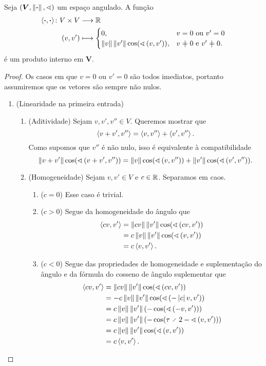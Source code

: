 \begin{proposition}
Seja $(\bm V, \left\Vert{\bm{\cdot}}\right\Vert,\sphericalangle)$ um espaço angulado. A função
	\begin{align*}
		\func{\inte{\var}{\var}}{V \times V}{\R}{(v,v')}{
			\begin{cases}
				0, &\text{$v=0$ ou $v'=0$} \\
				\nor{v}\nor{v'}\cos(\ang{v}{v'}), &\text{$v \neq 0$ e $v' \neq 0$}.
			\end{cases}
		}
	\end{align*}
é um produto interno em $\bm V$.
\end{proposition}
\begin{proof}
Os casos em que $v=0$ ou $v'=0$ são todos imediatos, portanto assumiremos que os vetores são sempre não nulos.
	\begin{enumerate}
		\item (Linearidade na primeira entrada)
			\begin{enumerate}
				\item (Aditividade) Sejam $v,v',v'' \in V$. Queremos mostrar que
					\begin{equation*}
						\left\langle{v+v'},{v''}\right\rangle = \left\langle{v},{v''}\right\rangle + \left\langle{v'},{v''}\right\rangle.
					\end{equation*}
				Como supomos que $v''$ é não nulo, isso é equivalente à compatibilidade
					\begin{equation*}
						\left\Vert{v+v'}\right\Vert\cos(\sphericalangle\left({v+v'},{v''}\right)) = \left\Vert{v}\right\Vert\cos(\sphericalangle\left({v},{v''}\right)) + \left\Vert{v'}\right\Vert\cos(\sphericalangle\left({v'},{v''}\right)).
					\end{equation*}

				\item (Homogeneidade) Sejam $v,v' \in V$ e $c \in \mathbb{R}$. Separamos em caos.
					\begin{enumerate}
						\item ($c=0$) Esse caso é trivial.
						\item ($c>0$) Segue da homogeneidade do ângulo que
							\begin{align*}
								\left\langle{cv},{v'}\right\rangle &= \left\Vert{cv}\right\Vert\left\Vert{v'}\right\Vert\cos(\sphericalangle\left({cv},{v'}\right)) \\
									&= c\left\Vert{v}\right\Vert\left\Vert{v'}\right\Vert\cos(\sphericalangle\left({v},{v'}\right)) \\
									&= c\left\langle{v},{v'}\right\rangle.
							\end{align*}
						\item ($c<0$) Segue das propriedades de homogeneidade e suplementação do ângulo e da fórmula do cosseno de ângulo suplementar que
							\begin{align*}
								\inte{cv}{v'} &= \nor{cv}\nor{v'}\cos(\ang{cv}{v'}) \\
									&= -c\nor{v}\nor{v'}\cos(\ang{-\abs{c}v}{v'}) \\
									&= c\nor{v}\nor{v'}(-\cos(\ang{-v}{v'})) \\
									&= c\nor{v}\nor{v'}(-\cos(\tau \div 2 - \ang{v}{v'})) \\
									&= c\nor{v}\nor{v'}\cos(\ang{v}{v'}) \\
									&= c\inte{v}{v'}.
							\end{align*}
					\end{enumerate}
			\end{enumerate}


\end{enumerate}
\end{proof}
